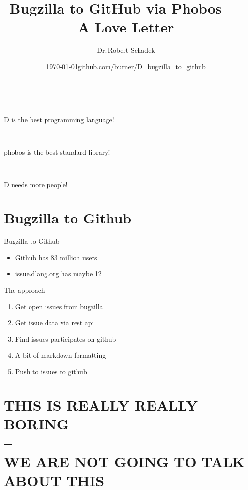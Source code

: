 \documentclass[aspectratio=169,notes]{beamer}
\title{Bugzilla to GitHub via Phobos --- A Love Letter}
\date{\today \hfill \url{github.com/burner/D\_bugzilla\_to\_github}}
\author{Dr.\,Robert Schadek}
\begin{document}
	\maketitle

	\begin{frame}[fragile]{\,}
		\begin{center}
			{\huge D is the best programming language!}
		\end{center}
	\end{frame}

	\begin{frame}[fragile]{\,}
		\begin{center}
			{\huge phobos is the best standard library!}
		\end{center}
	\end{frame}

	\begin{frame}[fragile]{\,}
		\begin{center}
			{\huge D needs more people!}
		\end{center}
	\end{frame}

	\section{Bugzilla to Github}
	\begin{frame}[fragile]{Bugzilla to Github}
		\Large
		\begin{itemize}
			\item Github has 83 million users
			\item issue.dlang.org has maybe 12
		\end{itemize}
	\end{frame}

	\begin{frame}[fragile]{The approach}
		\begin{enumerate}
			\item Get open issues from bugzilla
			\item Get issue data via rest api
			\item Find issues participates on github
			\item A bit of markdown formatting
			\item Push to issues to github
		\end{enumerate}
	\end{frame}

	\section{THIS IS REALLY REALLY BORING\\ --\\ WE ARE NOT GOING TO TALK ABOUT THIS}
\end{document}
